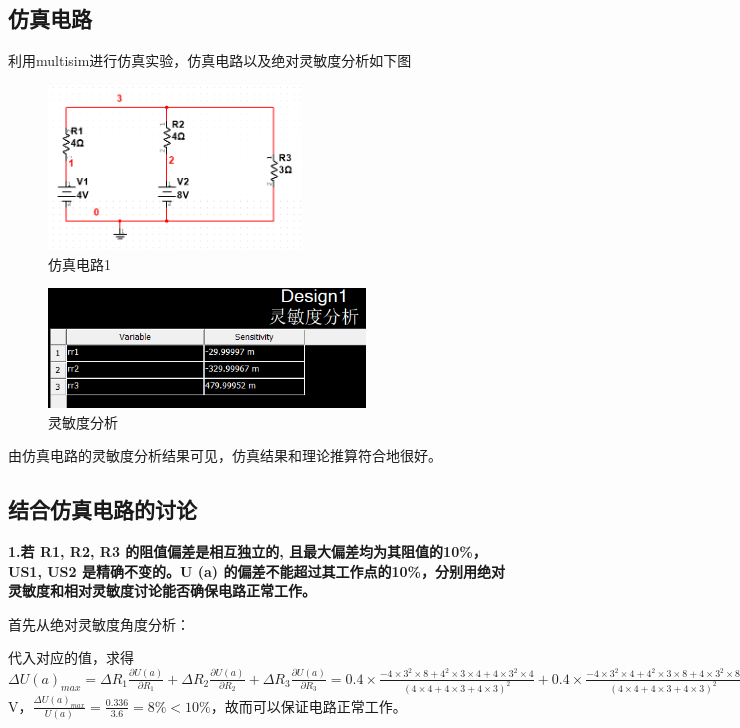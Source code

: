 \documentclass[UTF8]{ctexart}
\begin{document}
\subsection{仿真电路}
利用multisim进行仿真实验，仿真电路以及绝对灵敏度分析如下图
\begin{figure}[H]
\centering
\includegraphics[width=0.6\textwidth]{A.png}
\caption{仿真电路1}
\end{figure}
\begin{figure}[H]
\centering
\includegraphics[width=0.75\textwidth]{B.png}
\caption{灵敏度分析}
\end{figure}

由仿真电路的灵敏度分析结果可见，仿真结果和理论推算符合地很好。
\subsection{结合仿真电路的讨论}
\textbf{1.若 R1, R2, R3 的阻值偏差是相互独立的, 且最大偏差均为其阻值的10\%，US1, US2 是精确不变的。U (a) 的偏差不能超过其工作点的10\%，分别用绝对灵敏度和相对灵敏度讨论能否确保电路正常工作。}

首先从绝对灵敏度角度分析：

代入对应的值，求得$\Delta U(a)_{max}=\Delta R_1\frac{\partial U(a)}{\partial R_1}+\Delta R_2\frac{\partial U(a)}{\partial R_2}+\Delta R_3\frac{\partial U(a)}{\partial R_3}=0.4\times\frac{-4\times3^2\times8+4^2\times3\times4+4\times3^2\times4}{(4\times4+4\times3+4\times3)^2}+0.4\times\frac{-4\times3^2\times4+4^2\times3\times8+4\times3^2\times8}{(4\times4+4\times3+4\times3)^2}+0.3\times\frac{4\times4^2\times4+4^2\times4\times8}{(4\times4+4\times3+4\times3)^2}=0.288$V，$\frac{\Delta U(a)_{max}}{U(a)}=\frac{0.336}{3.6}=8\%<10\%$，故而可以保证电路正常工作。
\end{document}
